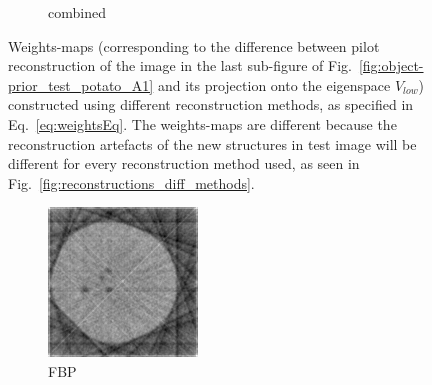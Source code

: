 \documentclass[journal]{IEEEtran}
\begin{document}
\begin{figure}[!h]
\begin{subfigure}[b]{0.24\linewidth}
        \caption{combined}
     \end{subfigure}
      \caption{Weights-maps (corresponding to the difference between pilot reconstruction of the image in the last sub-figure of Fig.~\ref{fig:object-prior_test_potato_A1} and its projection onto the eigenspace $V_{low}$) constructed using different reconstruction methods, as specified in Eq.~\ref{eq:weightsEq}. The weights-maps are different because the reconstruction artefacts of the new structures in test image will be different for every reconstruction method used, as seen in Fig.~\ref{fig:reconstructions_diff_methods}. }
\label{fig:weights_map_2Dpotato}
\end{figure}
\begin{figure}[!h]
    \begin{subfigure}[b]{0.24\linewidth}
        \includegraphics[width=\textwidth]{../images/potato/2D/fbp.png}
        \caption{FBP}
    \end{subfigure}
    \begin{subfigure}[b]{0.24\linewidth}

\end{subfigure}
\end{figure}
\end{document}
